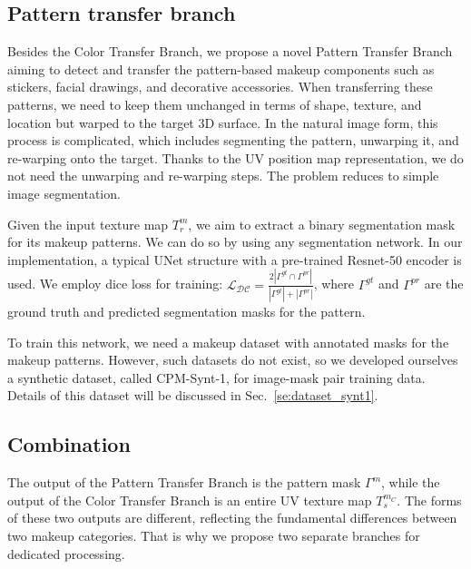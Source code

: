 \documentclass[final]{cvpr}
\newcommand{\Sref}[1]{Sec.~\ref{#1}}
\begin{document}
\subsection{Pattern transfer branch}\label{sec:pattern_transfer}
\label{sec:pattern_branch}
\vspace{-2mm}
Besides the Color Transfer Branch, we propose a novel Pattern Transfer Branch aiming to detect and transfer the pattern-based makeup components such as stickers, facial drawings, and decorative accessories. When transferring these patterns, we need to keep them unchanged in terms of shape, texture, and location but warped to the target 3D surface. In the natural image form, this process is complicated, which includes segmenting the pattern, unwarping it, and re-warping onto the target. Thanks to the UV position map representation, we do not need the unwarping and re-warping steps. The problem reduces to simple image segmentation.



Given the input texture map $T_{r}^{m}$, we aim to extract a binary segmentation mask for its makeup patterns. We can do so by using any segmentation network. In our implementation, a typical UNet structure with a pre-trained Resnet-50 encoder is used. We employ dice loss for training: $\mathcal{L_{DC}} = \frac{2|\Gamma^{gt}\cap \Gamma^{pr}|}{|\Gamma^{gt}|+|\Gamma^{pr}|}$,
where $\Gamma^{gt}$ and $\Gamma^{pr}$ are the ground truth and predicted segmentation masks for the pattern. 

To train this network, we need a makeup dataset with annotated masks for the makeup patterns. However, such datasets do not exist, so we developed ourselves a synthetic dataset, called CPM-Synt-1, for image-mask pair training data. Details of this dataset will be discussed in \Sref{se:dataset_synt1}.






\subsection{Combination}
\vspace{-2mm}
The output of the Pattern Transfer Branch is the pattern mask $\Gamma^{m}$, while the output of the Color Transfer Branch is an entire UV texture map $T_{s}^{m_C}$. The forms of these two outputs are different, reflecting the fundamental differences between two makeup categories. That is why we propose two separate branches for dedicated processing. 
\end{document}
